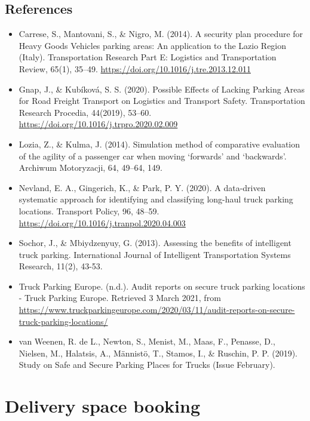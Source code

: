 \documentclass[
]{book}
\providecommand{\tightlist}{%
  \setlength{\itemsep}{0pt}\setlength{\parskip}{0pt}}
\begin{document}
\hypertarget{references-31}{%
\subsection*{References}\label{references-31}}

\begin{itemize}
\tightlist
\item
  Carrese, S., Mantovani, S., \& Nigro, M. (2014). A security plan procedure for Heavy Goods Vehicles parking areas: An application to the Lazio Region (Italy). Transportation Research Part E: Logistics and Transportation Review, 65(1), 35--49. \url{https://doi.org/10.1016/j.tre.2013.12.011}
\item
  Gnap, J., \& Kubíková, S. S. (2020). Possible Effects of Lacking Parking Areas for Road Freight Transport on Logistics and Transport Safety. Transportation Research Procedia, 44(2019), 53--60. \url{https://doi.org/10.1016/j.trpro.2020.02.009}
\item
  Lozia, Z., \& Kulma, J. (2014). Simulation method of comparative evaluation of the agility of a passenger car when moving `forwards' and `backwards'. Archiwum Motoryzacji, 64, 49--64, 149.
\item
  Nevland, E. A., Gingerich, K., \& Park, P. Y. (2020). A data-driven systematic approach for identifying and classifying long-haul truck parking locations. Transport Policy, 96, 48--59. \url{https://doi.org/10.1016/j.tranpol.2020.04.003}
\item
  Sochor, J., \& Mbiydzenyuy, G. (2013). Assessing the benefits of intelligent truck parking. International Journal of Intelligent Transportation Systems Research, 11(2), 43-53.
\item
  Truck Parking Europe. (n.d.). Audit reports on secure truck parking locations - Truck Parking Europe. Retrieved 3 March 2021, from \url{https://www.truckparkingeurope.com/2020/03/11/audit-reports-on-secure-truck-parking-locations/}
\item
  van Weenen, R. de L., Newton, S., Menist, M., Maas, F., Penasse, D., Nielsen, M., Halatsis, A., Männistö, T., Stamos, I., \& Ruschin, P. P. (2019). Study on Safe and Secure Parking Places for Trucks (Issue February).
\end{itemize}

\hypertarget{space_book}{%
\section{Delivery space booking}\label{space_book}}
\end{document}
